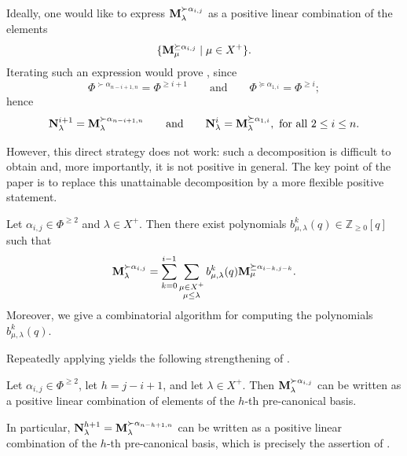 Ideally, one would like to express $\mathbf{M}_{\lambda}^{\succ \alpha_{i,j}}$ as a positive linear combination of the elements
\[
    \{\mathbf{M}_{\mu}^{\succeq \alpha_{i,j}}\mid \mu\in X^+\}.
\]
Iterating such an expression would prove , since
\begin{equation}
    \Phi^{\succ \alpha_{n-i+1,n}} =\Phi^{\geq i+1}
    \qquad \mbox{and} \qquad
    \Phi^{\succeq \alpha_{1,i}} = \Phi^{\geq i};
\end{equation}
hence
\begin{equation}\label{eq: M es N intro}
    \mathbf{N}_{\lambda}^{i+1} = \mathbf{M}_{\lambda}^{\succ \alpha_{n-i+1,n}} 
    \qquad \mbox{and} \qquad 
    \mathbf{N}_{\lambda}^i = \mathbf{M}_{\lambda}^{\succeq \alpha_{1,i}}, \mbox{ for all } 2\leq i\leq n.
\end{equation}

However, this direct strategy does not work: such a decomposition is difficult to obtain and, more importantly, it is not positive in general. The key point of the paper is to replace this unattainable decomposition by a more flexible positive statement.

\begin{introtheorem} \label{Teo D}
Let $\alpha_{i,j} \in \Phi^{\geq 2}$ and $\lambda \in X^+$. Then there exist polynomials $b_{\mu, \lambda }^k(q) \in \mathbb{Z}_{\geq 0}[q]$ such that
\begin{equation} \label{eq: intro descomposition}
    \mathbf{M}_{\lambda}^{\succ \alpha_{i,j} } = \sum_{k=0}^{i-1}  \sum_{\substack{\mu \in X^{+}\\ \mu \le \lambda}} b_{\mu, \lambda }^k(q) \mathbf{M}_{ \mu }^{\succeq \alpha_{i-k,j-k}}.
\end{equation}
Moreover, we give a combinatorial algorithm for computing the polynomials $b_{\mu,\lambda}^k(q)$.
\end{introtheorem}

Repeatedly applying  yields the following strengthening of .

\begin{introtheorem}  \label{Teo E}
    Let $\alpha_{i,j}\in\Phi^{\geq 2}$, let $h=j-i+1$, and let $\lambda\in X^+$. Then $\mathbf{M}_{\lambda}^{\succ \alpha_{i,j}}$ can be written as a positive linear combination of elements of the $h$-th pre-canonical basis.
    
    In particular, $\mathbf{N}^{h+1}_\lambda=\mathbf{M}_{\lambda}^{\succ \alpha_{n-h+1,n}}$ can be written as a positive linear combination of the $h$-th pre-canonical basis, which is precisely the assertion of .
\end{introtheorem}

